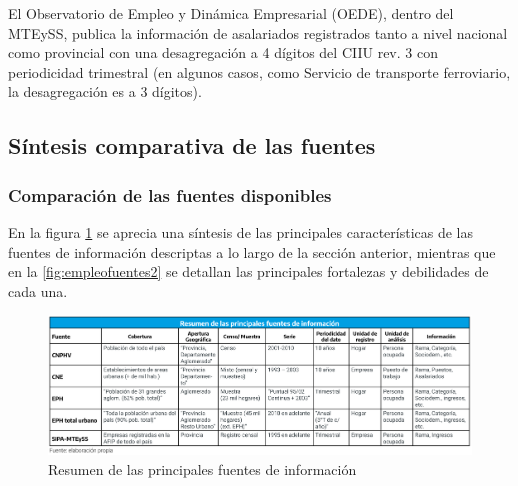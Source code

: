 \documentclass[
  openany]{book}
\begin{document}
El Observatorio de Empleo y Dinámica Empresarial (OEDE), dentro del MTEySS, publica la información de asalariados registrados tanto a nivel nacional como provincial con una desagregación a 4 dígitos del CIIU rev. 3 con periodicidad trimestral (en algunos casos, como Servicio de transporte ferroviario, la desagregación es a 3 dígitos).

\hypertarget{suxedntesis-comparativa-de-las-fuentes}{%
\subsection{Síntesis comparativa de las fuentes}\label{suxedntesis-comparativa-de-las-fuentes}}

\hypertarget{comparaciuxf3n-de-las-fuentes-disponibles}{%
\subsubsection{Comparación de las fuentes disponibles}\label{comparaciuxf3n-de-las-fuentes-disponibles}}

En la figura \ref{fig:empleofuentes1} se aprecia una síntesis de las principales características de las fuentes de información descriptas a lo largo de la sección anterior, mientras que en la \ref{fig:empleofuentes2} se detallan las principales fortalezas y debilidades de cada una.

\begin{figure}

{\centering \includegraphics[width=1\linewidth]{imagenes/figura3.1} 

}

\caption{Resumen de las principales fuentes de información}\label{fig:empleofuentes1}
\end{figure}
\end{document}

